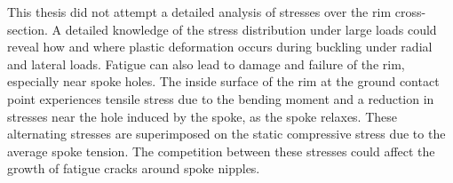 \documentclass[\rootdir/thesis.tex]{subfiles}
\begin{document}
This thesis did not attempt a detailed analysis of stresses over the rim cross-section. A detailed knowledge of the stress distribution under large loads could reveal how and where plastic deformation occurs during buckling under radial and lateral loads. Fatigue can also lead to damage and failure of the rim, especially near spoke holes. The inside surface of the rim at the ground contact point experiences tensile stress due to the bending moment and a reduction in stresses near the hole induced by the spoke, as the spoke relaxes. These alternating stresses are superimposed on the static compressive stress due to the average spoke tension. The competition between these stresses could affect the growth of fatigue cracks around spoke nipples.

\end{document}
